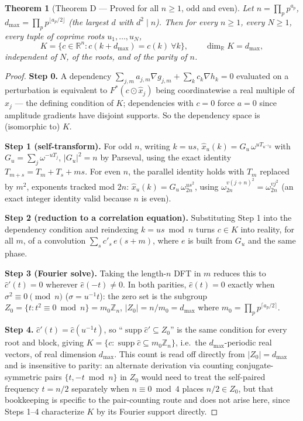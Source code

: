 \documentclass[11pt]{article}
\theoremstyle{plain}
\newtheorem{theorem}{Theorem}[section]
\theoremstyle{definition}
\theoremstyle{remark}
\newcommand{\R}{\mathbb R}
\newcommand{\Z}{\mathbb Z}
\begin{document}
\begin{theorem}[Theorem D --- Proved for all $n\ge1$, odd and even]\label{thm:D}
Let $n=\prod_p p^{a_p}$, $d_{\max}=\prod_p p^{\lfloor a_p/2\rfloor}$ (the
largest $d$ with $d^2\mid n$). Then for every $n\ge1$, every $N\ge1$, every
tuple of coprime roots $u_1,\dots,u_N$,
$$K=\{c\in\R^n: c(k+d_{\max})=c(k)\ \forall k\},\qquad \dim_\R K=d_{\max},$$
independent of $N$, of the roots, and of the parity of $n$.
\end{theorem}
\begin{proof}
\textbf{Step 0.} A dependency $\sum_{j,m}a_{j,m}\nabla g_{j,m}+\sum_kc_k\nabla h_k=0$
evaluated on a perturbation is equivalent to $F^*(c\odot\widehat x_j)$
being coordinatewise a real multiple of $x_j$ --- the defining condition
of $K$; dependencies with $c=0$ force $a=0$ since amplitude gradients have
disjoint supports. So the dependency space is (isomorphic to) $K$.

\textbf{Step 1 (self-transform).} For odd $n$, writing $k=us$,
$\widehat x_u(k)=G_u\,\omega^{uT_{u^{-1}k}}$ with $G_u=\sum_j\omega^{-uT_j}$,
$|G_u|^2=n$ by Parseval, using the exact identity $T_{m+s}=T_m+T_s+ms$. For
even $n$, the parallel identity holds with $T_m$ replaced by $m^2$,
exponents tracked mod $2n$: $\widehat x_u(k)=G_u\,\omega_{2n}^{us^2}$,
using $\omega_{2n}^{v(j+n)^2}=\omega_{2n}^{vj^2}$ (an exact integer
identity valid because $n$ is even).

\textbf{Step 2 (reduction to a correlation equation).} Substituting Step 1
into the dependency condition and reindexing $k=us\bmod n$ turns
$c\in K$ into reality, for all $m$, of a convolution
$\sum_sc'_s\,e(s+m)$, where $e$ is built from $G_u$ and the same phase.

\textbf{Step 3 (Fourier solve).} Taking the length-$n$ DFT in $m$ reduces
this to $\hat c'(t)=0$ wherever $\hat e(-t)\ne0$. In both parities,
$\hat e(t)=0$ exactly when $\sigma^2\equiv0\pmod n$ ($\sigma=u^{-1}t$): the
zero set is the subgroup $Z_0=\{t: t^2\equiv0\bmod n\}=m_0\Z_n$,
$|Z_0|=n/m_0=d_{\max}$ where $m_0=\prod_pp^{\lceil a_p/2\rceil}$.

\textbf{Step 4.} $\hat c'(t)=\hat c(u^{-1}t)$, so ``$\operatorname{supp}\hat c'\subseteq Z_0$''
is the same condition for every root and block, giving
$K=\{c:\operatorname{supp}\hat c\subseteq m_0\Z_n\}$, i.e.\ the
$d_{\max}$-periodic real vectors, of real dimension $d_{\max}$. This count
is read off directly from $|Z_0|=d_{\max}$ and is insensitive to parity:
an alternate derivation via counting conjugate-symmetric pairs
$\{t,-t\bmod n\}$ in $Z_0$ would need to treat the self-paired frequency
$t=n/2$ separately when $n\equiv0\bmod4$ places $n/2\in Z_0$, but that
bookkeeping is specific to the pair-counting route and does not arise
here, since Steps 1--4 characterize $K$ by its Fourier support directly.
\end{proof}
\end{document}
